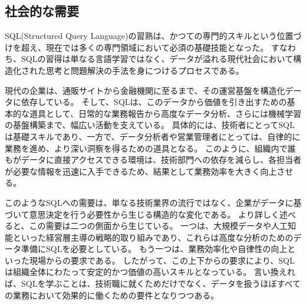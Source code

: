 \documentclass[uplatex,a4paper,12pt]{ujreport}
\begin{document}
\subsection{社会的な需要}
SQL(Structured Query Language)の習熟は、かつての専門的スキルという位置づけを超え、現在では多くの専門領域において必須の基礎技能となった。
すなわち、SQLの習得は単なる言語学習ではなく、データが溢れる現代社会において構造化された思考と問題解決の手法を身につけるプロセスである。
\par
現代の企業は、通販サイトから金融機関に至るまで、その運営基盤を構造化データに依存している。
そして、SQLは、このデータから価値を引き出すための基本的な道具として、日常的な業務報告から高度なデータ分析、さらには機械学習の基盤構築まで、幅広い活動を支えている。
具体的には、技術者にとってSQLは基礎スキルであり、一方で、データ分析者や営業管理者にとっては、自律的に業務を進め、より深い洞察を得るための道具となる。
このように、組織内で誰もがデータに直接アクセスできる環境は、技術部門への依存を減らし、各担当者が必要な情報を迅速に入手できるため、結果として業務効率を大きく向上させる。
\par
このようなSQLへの需要は、単なる技術業界の流行ではなく、企業がデータに基づいて意思決定を行う必要性から生じる構造的な変化である。
より詳しく述べると、この需要は二つの側面から生じている。
一つは、大規模データや人工知能といった経営層主導の戦略的取り組みであり、これらは高度な分析のためのデータ準備にSQLを必要としている。
もう一つは、業務効率化や自律性の向上といった現場からの要求である。
したがって、この上下からの要求により、SQLは組織全体にわたって安定的かつ価値の高いスキルとなっている。
言い換えれば、SQLを学ぶことは、技術職に就くためだけでなく、データを扱うほぼすべての業務において効果的に働くための要件となりつつある。
\end{document}
